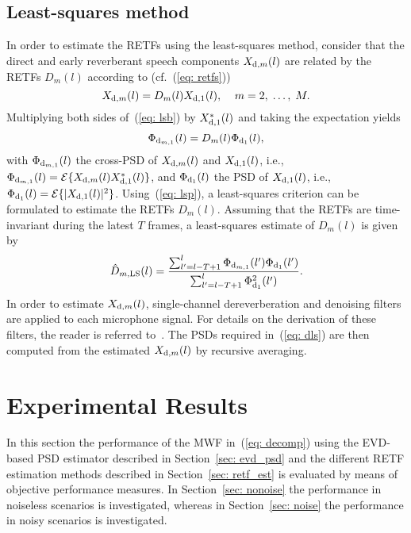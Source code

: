 \documentclass{article}
\begin{document}
\subsection{Least-squares method}
\label{sec: ls}
In order to estimate the RETFs using the least-squares method, consider that the direct and early reverberant speech components $X_{{\rm d},m}(l)$ are related by the RETFs $D_m(l)$ according to (cf.~(\ref{eq: retfs}))
\begin{equation}
  \label{eq: lsb}
  X_{{\rm d},m}(l) = D_m(l)X_{{\rm d},1}(l), \; \; \; \; m =2, \; \ldots, \; M.
\end{equation}
Multiplying both sides of~(\ref{eq: lsb}) by $X^*_{{\rm d},1}(l)$ and taking the expectation yields
\begin{equation}
  \label{eq: lsp}
  \Phi_{{\rm d}_{m,1}}(l) = D_m(l)\Phi_{{\rm d}_1}(l),
\end{equation}
with $\Phi_{{\rm d}_{m,1}}(l)$ the cross-PSD of $X_{{\rm d},m}(l)$ and $X_{{\rm d},1}(l)$, i.e., $\Phi_{{\rm d}_{m,1}}(l) = {\cal{E}} \{X_{{\rm d},m}(l) X^*_{{\rm d},1}(l) \}$, and $\Phi_{{\rm d}_1}(l)$ the PSD of $X_{{\rm d}, 1}(l)$, i.e., $\Phi_{{\rm d}_1}(l) = {\cal{E}} \{|X_{\rm d,1}(l)|^2 \}$.
Using~(\ref{eq: lsp}), a least-squares criterion can be formulated to estimate the RETFs $D_m(l)$.
Assuming that the RETFs are time-invariant during the latest $T$ frames, a least-squares estimate of $D_m(l)$ is given by
\begin{equation}
  \label{eq: dls}
  \hat{D}_{m, {\rm LS}}(l) = \frac{ \sum_{l' = l-T+1}^l \Phi_{{\rm d}_{m,1}}(l')\Phi_{{\rm d}_1}(l') } { \sum_{l' = l-T+1}^l \Phi^2_{{\rm d}_1}(l') }.
\end{equation}
In order to estimate $X_{{\rm d},m}(l)$, single-channel dereverberation and denoising filters are applied to each microphone signal.
For details on the derivation of these filters, the reader is referred to~\cite{OSchwartz_ITASLP_2015}.
The PSDs required in~(\ref{eq: dls}) are then computed from the estimated $X_{{\rm d},m}(l)$ by recursive averaging.
\section{Experimental Results}
In this section the performance of the MWF in~(\ref{eq: decomp}) using the EVD-based PSD estimator described in Section~\ref{sec: evd_psd} and the different RETF estimation methods described in Section~\ref{sec: retf_est} is evaluated by means of objective performance measures.
In Section~\ref{sec: nonoise} the performance in noiseless scenarios is investigated, whereas in Section~\ref{sec: noise} the performance in noisy scenarios is investigated.
\end{document}
